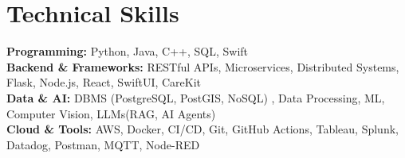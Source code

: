 \documentclass[letterpaper,11pt]{article}
\begin{document}
\section*{Technical Skills}

\textbf{Programming:} Python, Java, C++, SQL, Swift \\

\textbf{Backend \& Frameworks:} RESTful APIs, Microservices, Distributed Systems, Flask, Node.js, React, SwiftUI, CareKit \\

\textbf{Data \& AI:} DBMS (PostgreSQL, PostGIS, NoSQL) , Data Processing, ML, Computer Vision, LLMs(RAG, AI Agents) \\

\textbf{Cloud \& Tools:} AWS, Docker, CI/CD, Git, GitHub Actions, Tableau, Splunk, Datadog, Postman, MQTT, Node-RED
\end{document}
